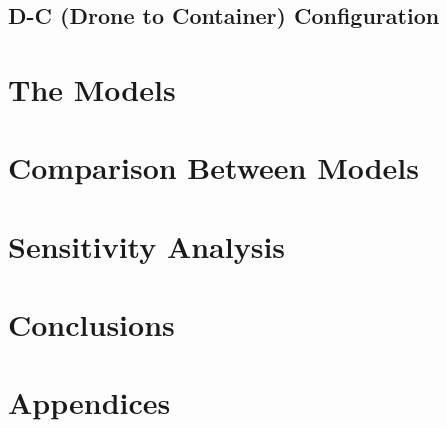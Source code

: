 \documentclass[a4paper,12pt]{article}
\begin{document}
\subsection{D-C (Drone to Container) Configuration}



\newpage

\section{The Models}


\newpage

\section{Comparison Between Models}

\newpage

\section{Sensitivity Analysis}

\newpage

\section{Conclusions}

\newpage

\section{Appendices}
\end{document}
